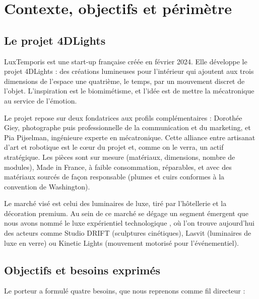 \documentclass[11pt,a4paper]{article}
\begin{document}
\section{Contexte, objectifs et périmètre}

\subsection{Le projet 4DLights}

LuxTemporis est une start-up française créée en février 2024. Elle développe le projet 4DLights : des créations lumineuses pour l'intérieur qui ajoutent aux trois dimensions de l'espace une quatrième, le temps, par un mouvement discret de l'objet. L'inspiration est le biomimétisme, et l'idée est de mettre la mécatronique au service de l'émotion.

Le projet repose sur deux fondatrices aux profils complémentaires : Dorothée Giey, photographe puis professionnelle de la communication et du marketing, et Pia Pijselman, ingénieure experte en mécatronique. Cette alliance entre artisanat d'art et robotique est le c\oe ur du projet et, comme on le verra, un actif stratégique. Les pièces sont sur mesure (matériaux, dimensions, nombre de modules), Made in France, à faible consommation, réparables, et avec des matériaux sourcés de façon responsable (plumes et cuirs conformes à la convention de Washington).

Le marché visé est celui des luminaires de luxe, tiré par l'hôtellerie et la décoration premium. Au sein de ce marché se dégage un segment émergent que nous avons nommé le \og luxe expérientiel technologique \fg{}, où l'on trouve aujourd'hui des acteurs comme Studio DRIFT (sculptures cinétiques), Lasvit (luminaires de luxe en verre) ou Kinetic Lights (mouvement motorisé pour l'événementiel).

\subsection{Objectifs et besoins exprimés}

Le porteur a formulé quatre besoins, que nous reprenons comme fil directeur :
\end{document}
